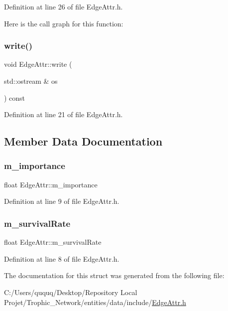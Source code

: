 Definition at line 26 of file Edge\+Attr.\+h.

Here is the call graph for this function\+:
\mbox{\label{struct_edge_attr_ae06ea6b6bfd925ea64ce85ca1169411a}} 
\subsubsection{\texorpdfstring{write()}{write()}}
{\footnotesize\ttfamily void Edge\+Attr\+::write (\begin{DoxyParamCaption}\item[{std\+::ostream \&}]{os }\end{DoxyParamCaption}) const\hspace{0.3cm}{\ttfamily [inline]}}



Definition at line 21 of file Edge\+Attr.\+h.



\subsection{Member Data Documentation}
\mbox{\label{struct_edge_attr_a56b31d6b4731ac893c4081e0eab931d0}} 
\subsubsection{\texorpdfstring{m\+\_\+importance}{m\_importance}}
{\footnotesize\ttfamily float Edge\+Attr\+::m\+\_\+importance}



Definition at line 9 of file Edge\+Attr.\+h.

\mbox{\label{struct_edge_attr_ab59fbd7d336f72ac48294c8c7bb9e4ef}} 
\subsubsection{\texorpdfstring{m\+\_\+survival\+Rate}{m\_survivalRate}}
{\footnotesize\ttfamily float Edge\+Attr\+::m\+\_\+survival\+Rate}



Definition at line 8 of file Edge\+Attr.\+h.



The documentation for this struct was generated from the following file\+:\begin{DoxyCompactItemize}
\item 
C\+:/\+Users/ququq/\+Desktop/\+Repository Local Projet/\+Trophic\+\_\+\+Network/entities/data/include/\mbox{\hyperlink{_edge_attr_8h}{Edge\+Attr.\+h}}\end{DoxyCompactItemize}
